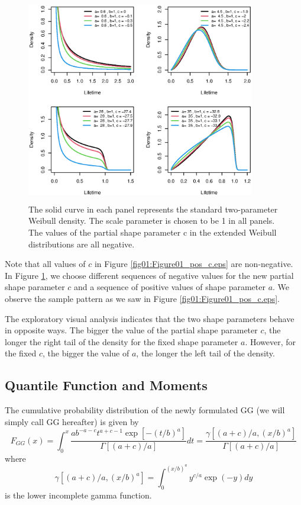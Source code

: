\documentclass{ps}
\theoremstyle{plain}%
\theoremstyle{definition}
\theoremstyle{remark}
\begin{document}
\begin{figure}[h!]
	\centering	\includegraphics[width=10cm,height=9cm]{Figure02_neg_c_val.eps}
	\caption{The solid curve in each panel represents the standard two-parameter Weibull density. The scale parameter is chosen to be 1 in all panels. The values of the partial shape parameter c in the extended Weibull distributions are all negative. }
	\label{fig02:Figure02_neg_c.eps}
\end{figure}

Note that all values of $c$ in Figure \ref{fig01:Figure01_pos_c.eps} are non-negative.  In Figure \ref{fig02:Figure02_neg_c.eps}, we choose different sequences of negative values for the new partial shape parameter $c$  and a sequence of positive values of shape parameter $a$. We observe the sample pattern as we saw in Figure \ref{fig01:Figure01_pos_c.eps}. 


The exploratory visual analysis indicates that the two shape parameters behave in opposite ways. The bigger the value of the partial shape parameter $c$, the longer the right tail of the density for the fixed shape parameter $a$. However, for the fixed $c$, the bigger the value of $a$, the longer the left tail of the density.  



\subsection{Quantile Function and Moments} 

The cumulative probability distribution of the newly formulated GG (we will simply call GG hereafter) is given by
\begin{equation}\label{new-GG-CDF}
	F_{GG}(x)=\int_0^x\frac{ab^{-a-c}t^{a+c-1}\exp[-(t/b)^a]}{\Gamma[(a+c)/a]}dt = \frac{\gamma \left[(a+c)/a, (x/b)^a \right]}{\Gamma[(a+c)/a]}
\end{equation}
\noindent where
\begin{equation}
	\gamma \left[(a+c)/a, (x/b)^a \right] = \int_0^{(x/b)^a}y^{c/a}\exp(-y)dy
\end{equation}
\noindent is the lower incomplete gamma function. 
\end{document}
